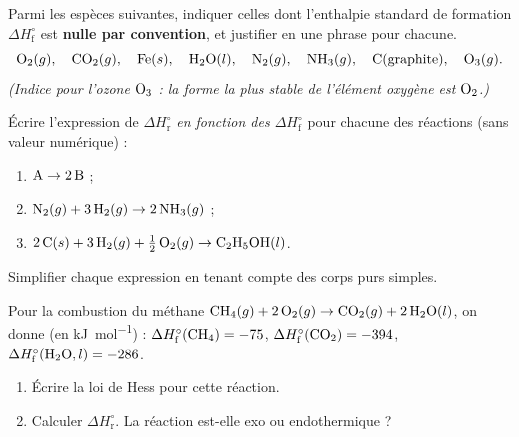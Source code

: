 \documentclass[11pt,a4paper]{article}
\newcommand{\dHr}{\Delta H^{\circ}_{\text{r}}}
\newcommand{\dHf}{\Delta H^{\circ}_{\text{f}}}
\begin{document}
\begin{center}
\end{center}

\begin{exercice}[reconnaître un $\dHf$ nul]
Parmi les espèces suivantes, indiquer celles dont l'enthalpie standard de formation $\dHf$ est
\textbf{nulle par convention}, et justifier en une phrase pour chacune.
\[ \ce{O2}(g),\quad \ce{CO2}(g),\quad \ce{Fe}(s),\quad \ce{H2O}(l),\quad \ce{N2}(g),\quad \ce{NH3}(g),
   \quad \ce{C}(\text{graphite}),\quad \ce{O3}(g). \]
\emph{(Indice pour l'ozone $\ce{O3}$ : la forme la plus stable de l'élément oxygène est $\ce{O2}$.)}
\end{exercice}

\begin{exercice}
Écrire l'expression de $\dHr$ \emph{en fonction des $\dHf$} pour chacune des réactions (sans valeur numérique) :
\begin{enumerate}[label=\alph*),leftmargin=2em,topsep=2pt,itemsep=2pt]
  \item $\ce{A} \rightarrow 2\,\ce{B}$ ;
  \item $\ce{N2}(g) + 3\,\ce{H2}(g) \rightarrow 2\,\ce{NH3}(g)$ ;
  \item $2\,\ce{C}(s) + 3\,\ce{H2}(g) + \tfrac12\,\ce{O2}(g) \rightarrow \ce{C2H5OH}(l)$.
\end{enumerate}
Simplifier chaque expression en tenant compte des corps purs simples.
\end{exercice}

\begin{exercice}
Pour la combustion du méthane \;$\ce{CH4}(g) + 2\,\ce{O2}(g) \rightarrow \ce{CO2}(g) + 2\,\ce{H2O}(l)$,\;
on donne (en \si{\kilo\joule\per\mol}) : $\dHf(\ce{CH4})=-75$, $\dHf(\ce{CO2})=-394$, $\dHf(\ce{H2O},l)=-286$.
\begin{enumerate}[label=\alph*),leftmargin=2em,topsep=2pt,itemsep=2pt]
  \item Écrire la loi de Hess pour cette réaction.
  \item Calculer $\dHr$. La réaction est-elle exo ou endothermique ?
\end{enumerate}
\end{exercice}
\end{document}
